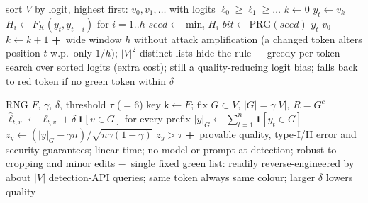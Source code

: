\documentclass[10pt,a4paper,twocolumn]{article}
\newcommand{\pro}[1]{\Statex\textcolor{proc}{\textbf{+}\ #1}}
\newcommand{\con}[1]{\Statex\textcolor{conc}{\textbf{$-$}\ #1}}
\begin{document}
\begin{algorithm}[H]\small
\caption{KGW self-hash: choose token $y_t$ (window $h$, key $K$, boost $\delta$)}
\begin{algorithmic}[1]
\State sort $V$ by logit, highest first: $v_0,v_1,\dots$ with logits $\ell_0\ge\ell_1\ge\dots$ 
\State $k\gets0$
 \State $y_t\gets v_k$ 
 \State $H_i\gets F_K(y_t,y_{t-i})$ for $i=1..h$ 
 \State $\mathit{seed}\gets\min_i H_i$
 \State $\mathit{bit}\gets\mathrm{PRG}(\mathit{seed})$ 
  \State \Return $y_t$ 
  \State \Return $v_0$ 
 \Else
  \State $k\gets k+1$ 
 \EndIf
\EndWhile
\pro{wide window $h$ without attack amplification (a changed token alters position $t$ w.p.\ only $1/h$); $|V|^2$ distinct lists hide the rule}
\con{greedy per-token search over sorted logits (extra cost); still a quality-reducing logit bias; falls back to red token if no green token within $\delta$}
\end{algorithmic}
\end{algorithm}

\begin{algorithm}[H]\small
\caption{Unigram-Watermark (Zhao et al.\ 2023)}
\begin{algorithmic}[1]
\Require RNG $F$, $\gamma$, $\delta$, threshold $\tau$ ($=6$)
 \State key $\mathsf k\gets F$; fix $G\subset V$, $|G|=\gamma|V|$, $R=G^c$ 
 \State $\hat\ell_{t,v}\gets\ell_{t,v}+\delta\,\mathbf 1[v\in G]$ for every prefix
\EndProcedure
{}
 \State $|y|_G\gets\sum_{t=1}^n\mathbf 1[y_t\in G]$
 \State $z_y\gets(|y|_G-\gamma n)/\sqrt{n\gamma(1-\gamma)}$
 \State \Return $z_y>\tau$
\EndProcedure
\pro{provable quality, type-I/II error and security guarantees; linear time; no model or prompt at detection; robust to cropping and minor edits}
\con{single fixed green list: readily reverse-engineered by about $|V|$ detection-API queries; same token always same colour; larger $\delta$ lowers quality}
\end{algorithmic}
\end{algorithm}
\end{document}
